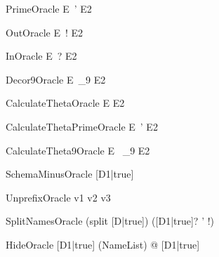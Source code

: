 \documentclass{article}
\newcommand{\unprefix}{\mathrel{unprefix}}
\begin{document}
\begin{zedoracle}{PrimeOracle}
  E~' \is E2
\end{zedoracle}

\begin{zedoracle}{OutOracle}
  E~! \is E2
\end{zedoracle}

\begin{zedoracle}{InOracle}
  E~? \is E2
\end{zedoracle}

\begin{zedoracle}{Decor9Oracle}
  E~_9 \is E2
\end{zedoracle}

\begin{zedoracle}{CalculateThetaOracle}
  \theta E \is E2
\end{zedoracle}

\begin{zedoracle}{CalculateThetaPrimeOracle}
  \theta E~' \is E2
\end{zedoracle}

\begin{zedoracle}{CalculateTheta9Oracle}
  \theta E~ _9 \is E2
\end{zedoracle}

\begin{zedoracle}{SchemaMinusOracle}
  [D1|true] \schemaminus [D2|true] \is [D3|true]
\end{zedoracle}

\begin{zedoracle}{UnprefixOracle}
  v1 \unprefix v2 \is v3
\end{zedoracle}

\begin{zedoracle}{SplitNamesOracle}
  (split [D|true]) \is ([D1|true]? \land [D2|true] \land
                        [D3|true]' \land [D4|true]!)
\end{zedoracle}

\begin{zedoracle}{HideOracle}
  [D1|true] \hide (NameList) \is \exists [D2|true] @ [D1|true]
\end{zedoracle}
\end{document}
